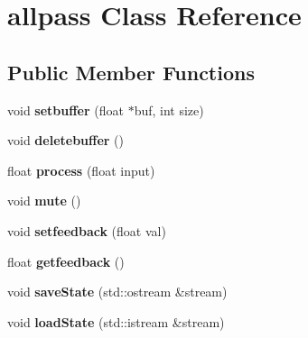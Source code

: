 \hypertarget{classallpass}{\section{allpass Class Reference}
\label{classallpass}
}
\subsection*{Public Member Functions}
\begin{DoxyCompactItemize}
\item 
\hypertarget{classallpass_ae107adccefebabb0578dc5b9ad89c5d7}{void {\bfseries setbuffer} (float $\ast$buf, int size)}\label{classallpass_ae107adccefebabb0578dc5b9ad89c5d7}

\item 
\hypertarget{classallpass_a00c687ab45146279654ded860474e368}{void {\bfseries deletebuffer} ()}\label{classallpass_a00c687ab45146279654ded860474e368}

\item 
\hypertarget{classallpass_ad90e04db3458e4f6918191884cf65b8e}{float {\bfseries process} (float input)}\label{classallpass_ad90e04db3458e4f6918191884cf65b8e}

\item 
\hypertarget{classallpass_af93a4f1d4dcc544323978031cb234aa6}{void {\bfseries mute} ()}\label{classallpass_af93a4f1d4dcc544323978031cb234aa6}

\item 
\hypertarget{classallpass_ad636d830e21de3dd61928875db95c899}{void {\bfseries setfeedback} (float val)}\label{classallpass_ad636d830e21de3dd61928875db95c899}

\item 
\hypertarget{classallpass_a19e2ab2745647005ce06366b7da64b45}{float {\bfseries getfeedback} ()}\label{classallpass_a19e2ab2745647005ce06366b7da64b45}

\item 
\hypertarget{classallpass_a7110b02ca70f6a56e4d9b11339783b17}{void {\bfseries save\-State} (std\-::ostream \&stream)}\label{classallpass_a7110b02ca70f6a56e4d9b11339783b17}

\item 
\hypertarget{classallpass_a1bcb9cc1309ac57a8eee87ffe4080ce5}{void {\bfseries load\-State} (std\-::istream \&stream)}\label{classallpass_a1bcb9cc1309ac57a8eee87ffe4080ce5}

\end{DoxyCompactItemize}

